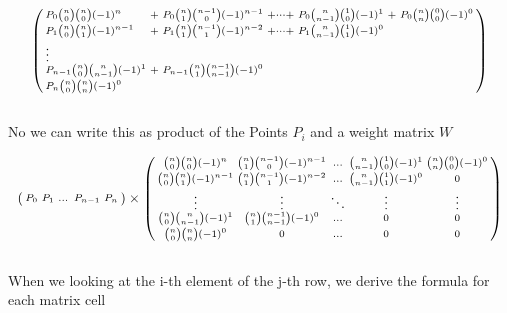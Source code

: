\begin{equation*}
    \begin{psmallmatrix*}[l]
        P_0     {n \choose 0}{n \choose 0}  (-1)^{n}   &+& P_0     {n \choose 1}{n-1 \choose 0}(-1)^{n-1} &+ \dots + & P_0 {n \choose n-1}{1 \choose 0}(-1)^{1} &+& P_0 {n \choose n}{0 \choose 0}(-1)^{0} \\
        P_1     {n \choose 0}{n \choose 1}  (-1)^{n-1} &+& P_1     {n \choose 1}{n-1 \choose 1}(-1)^{n-2} &+ \dots + & P_1 {n \choose n-1}{1 \choose 1}(-1)^{0}                                            \\
        \vdots                                                                                                                                                                                             \\
        P_{n-1} {n \choose 0}{n \choose n-1}(-1)^{1}   &+& P_{n-1} {n \choose 1}{n-1 \choose n-1}(-1)^{0}                                                                                                  \\
        P_{n}   {n \choose 0}{n \choose n}  (-1)^{0}
    \end{psmallmatrix*}
\end{equation*}
\\
No we can write this as product of the Points $P_i$ and a weight matrix $W$

\begin{equation*}
    \begin{psmallmatrix*}
        P_0 & P_1 & \dots & P_{n-1} & P_{n}
    \end{psmallmatrix*}
    \times
    \begin{psmallmatrix*}
        {n \choose 0}{n \choose 0}(-1)^{n}   & {n \choose 1}{n-1 \choose 0}(-1)^{n-1}  & \hdots & {n \choose n-1}{1 \choose 0}(-1)^{1} & {n \choose n}{0 \choose 0}(-1)^{0} \\
        {n \choose 0}{n \choose 1}(-1)^{n-1} & {n \choose 1}{n-1 \choose 1}(-1)^{n-2}  & \hdots & {n \choose n-1}{1 \choose 1}(-1)^{0} & 0                                  \\
        \vdots                               & \vdots                                  & \ddots & \vdots                               & \vdots                             \\
        {n \choose 0}{n \choose n-1}(-1)^{1} & {n \choose 1}{n-1 \choose n-1}(-1)^{0}  & \hdots & 0                                    & 0                                  \\
        {n \choose 0}{n \choose n}(-1)^{0}   & 0                                       & \hdots & 0                                    & 0
    \end{psmallmatrix*}
\end{equation*}
\\
When we looking at the i-th element of the j-th row, we derive the formula for each matrix cell

